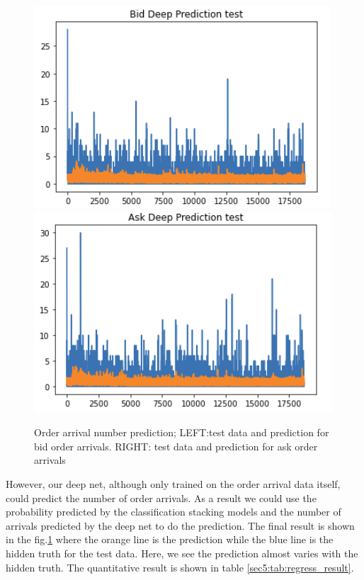 \documentclass[letterpaper,12pt]{article}
\numberwithin{equation}{section}
\begin{document}
\begin{figure}
    \centering
    \includegraphics[scale=0.5]{figs/bid_number_pred.png}
    \includegraphics[scale=0.5]{figs/ask_number_pred.png}
    \caption{Order arrival number prediction; LEFT:test data and prediction for  bid order arrivals. RIGHT: test data and prediction for ask order arrivals }
    \label{sec5:fig:number_pred}
\end{figure}

However, our deep net, although only trained on the order arrival data itself, could predict the number of order arrivals. As a result we could use the probability predicted by the classification stacking models and the number of arrivals predicted by the deep net to do the prediction. The final result is shown in the fig.\ref{sec5:fig:number_pred} where the orange line is the prediction while the blue line is the hidden truth for the test data. Here, we see the prediction almost varies with the hidden truth. The quantitative result is shown in table \ref{sec5:tab:regress_result}. 
\end{document}
